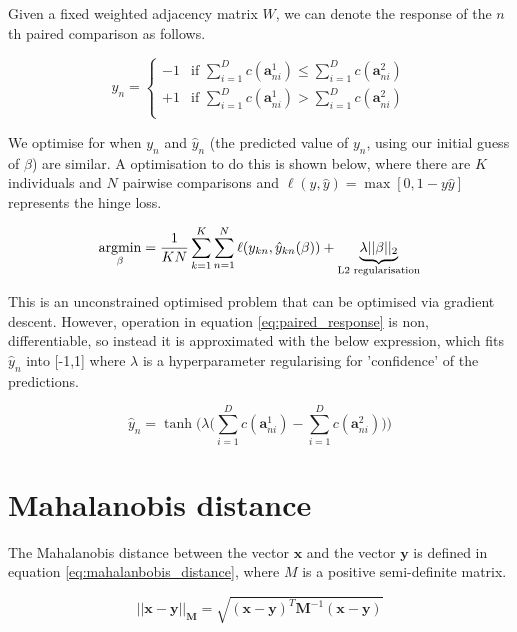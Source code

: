Given a fixed weighted adjacency matrix $W$, we can denote the response of the $n$th paired comparison as follows.

\begin{equation} \label{eq:paired_response}
	y_{n} = \begin{cases}
		-1 & \text{if } \sum_{i=1}^D c(\mathbf{a}^1_{ni}) \leq \sum_{i=1}^D c(\mathbf{a}^2_{ni}) \\
		+1 & \text{if }  \sum_{i=1}^D c(\mathbf{a}^1_{ni}) > \sum_{i=1}^D c(\mathbf{a}^2_{ni}) \\
	\end{cases}
\end{equation}

We optimise for when $y_n$ and $\hat{y}_n$ (the predicted value of $y_n$, using our initial guess of $\beta$) are similar. A optimisation to do this is shown below, where there are $K$ individuals and $N$ pairwise comparisons and $\ell(y, \hat{y}) = \max[0, 1-y\hat{y}]$ represents the hinge loss.

\begin{equation}
	\operatorname*{argmin}_\beta = \frac{1}{KN} \sum_{k=1}^K \sum_{n=1}^N \ell (y_{kn}, \hat{y}_{kn}(\beta)) + \underbrace{\lambda ||\beta||_2}_{\text{L2 regularisation}}
\end{equation}

This is an unconstrained optimised problem that can be optimised via gradient descent. However, operation in equation \ref{eq:paired_response} is non, differentiable, so instead it is approximated with the below expression, which fits $\hat{y}_n$ into [-1,1] where $\lambda$ is a hyperparameter regularising for 'confidence' of the predictions.

\begin{equation}
	\hat{y}_n = \tanh \Bigg(\lambda \Big(\sum_{i=1}^D c(\mathbf{a}^1_{ni}) - \sum_{i=1}^D c(\mathbf{a}^2_{ni})\Big)\Bigg)
\end{equation}


\section{Mahalanobis distance}

The Mahalanobis distance between the vector $\mathbf{x}$ and the vector $\mathbf{y}$ is defined in equation \ref{eq:mahalanbobis_distance}, where $M$ is a positive semi-definite matrix.

\begin{equation} \label{eq:mahalanbobis_distance}
	||\mathbf{x-y}||_{\mathbf{M}} = \sqrt{(\mathbf{x-y})^T\mathbf{M}^{-1}(\mathbf{x-y})}
\end{equation}

